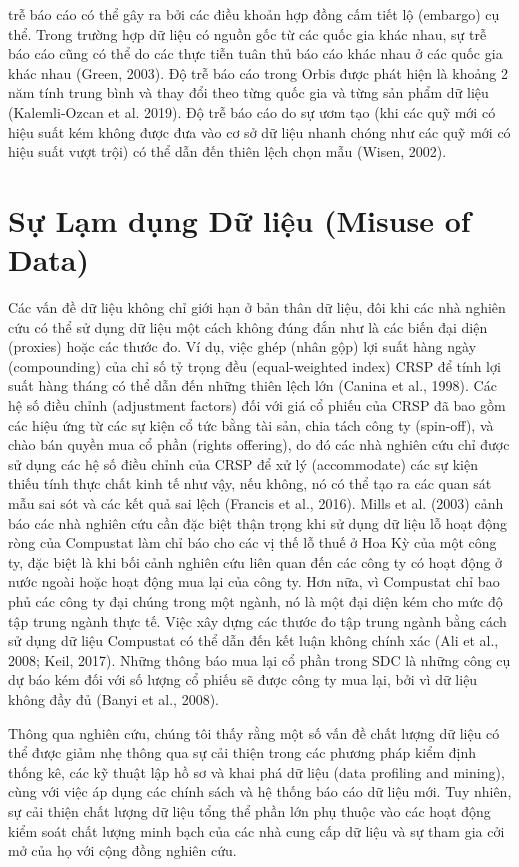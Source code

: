 trễ báo cáo có thể gây ra bởi các điều khoản hợp đồng cấm tiết lộ (embargo) cụ thể. Trong trường hợp dữ liệu có nguồn gốc từ các quốc gia khác nhau, sự trễ báo cáo cũng có thể do các thực tiễn tuân thủ báo cáo khác nhau ở các quốc gia khác nhau (Green, 2003). Độ trễ báo cáo trong Orbis được phát hiện là khoảng 2 năm tính trung bình và thay đổi theo từng quốc gia và từng sản phẩm dữ liệu (Kalemli-Ozcan et al. 2019). Độ trễ báo cáo do sự ươm tạo (khi các quỹ mới có hiệu suất kém không được đưa vào cơ sở dữ liệu nhanh chóng như các quỹ mới có hiệu suất vượt trội) có thể dẫn đến thiên lệch chọn mẫu (Wisen, 2002).

\section{Sự Lạm dụng Dữ liệu (Misuse of Data)}

Các vấn đề dữ liệu không chỉ giới hạn ở bản thân dữ liệu, đôi khi các nhà nghiên cứu có thể sử dụng dữ liệu một cách không đúng đắn như là các biến đại diện (proxies) hoặc các thước đo. Ví dụ, việc ghép (nhân gộp) lợi suất hàng ngày (compounding) của chỉ số tỷ trọng đều (equal-weighted index) CRSP để tính lợi suất hàng tháng có thể dẫn đến những thiên lệch lớn (Canina et al., 1998). Các hệ số điều chỉnh (adjustment factors) đối với giá cổ phiếu của CRSP đã bao gồm các hiệu ứng từ các sự kiện cổ tức bằng tài sản, chia tách công ty (spin-off), và chào bán quyền mua cổ phần (rights offering), do đó các nhà nghiên cứu chỉ được sử dụng các hệ số điều chỉnh của CRSP để xử lý (accommodate) các sự kiện thiếu tính thực chất kinh tế như vậy, nếu không, nó có thể tạo ra các quan sát mẫu sai sót và các kết quả sai lệch (Francis et al., 2016). Mills et al. (2003) cảnh báo các nhà nghiên cứu cần đặc biệt thận trọng khi sử dụng dữ liệu lỗ hoạt động ròng của Compustat làm chỉ báo cho các vị thế lỗ thuế ở Hoa Kỳ của một công ty, đặc biệt là khi bối cảnh nghiên cứu liên quan đến các công ty có hoạt động ở nước ngoài hoặc hoạt động mua lại của công ty. Hơn nữa, vì Compustat chỉ bao phủ các công ty đại chúng trong một ngành, nó là một đại diện kém cho mức độ tập trung ngành thực tế. Việc xây dựng các thước đo tập trung ngành bằng cách sử dụng dữ liệu Compustat có thể dẫn đến kết luận không chính xác (Ali et al., 2008; Keil, 2017). Những thông báo mua lại cổ phần trong SDC là những công cụ dự báo kém đối với số lượng cổ phiếu sẽ được công ty mua lại, bởi vì dữ liệu không đầy đủ (Banyi et al., 2008).

Thông qua nghiên cứu, chúng tôi thấy rằng một số vấn đề chất lượng dữ liệu có thể được giảm nhẹ thông qua sự cải thiện trong các phương pháp kiểm định thống kê, các kỹ thuật lập hồ sơ và khai phá dữ liệu (data profiling and mining), cùng với việc áp dụng các chính sách và hệ thống báo cáo dữ liệu mới. Tuy nhiên, sự cải thiện chất lượng dữ liệu tổng thể phần lớn phụ thuộc vào các hoạt động kiểm soát chất lượng minh bạch của các nhà cung cấp dữ liệu và sự tham gia cởi mở của họ với cộng đồng nghiên cứu.

